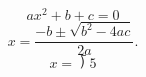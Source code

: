 \documentclass{article}
\begin{document}
\[
  ax^2+b+c=0
\]
\[
  x = \frac{-b \pm \sqrt{b^2-4ac}}{2a}.
\]
\[
  x = \longdivision{5}
\]
\end{document}
